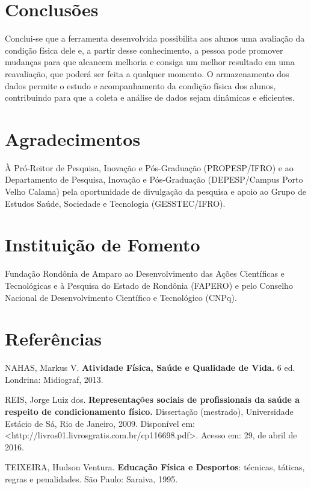 \documentclass[article,12pt,onesidea,4paper,english,brazil]{abntex2}
\begin{document}
	\section*{Conclusões}
	
	Conclui-se que a ferramenta desenvolvida possibilita aos alunos uma avaliação da condição física dele e, a partir desse conhecimento, a pessoa pode promover mudanças para que alcancem melhoria e consiga um melhor resultado em uma reavaliação, que poderá ser feita a qualquer momento. O armazenamento dos dados permite o estudo e acompanhamento da condição física dos alunos, contribuindo para que a coleta e análise de dados sejam dinâmicas e eficientes.
	
	\section*{Agradecimentos}
	À Pró-Reitor de Pesquisa, Inovação e Pós-Graduação (PROPESP/IFRO) e ao Departamento de Pesquisa, Inovação e Pós-Graduação (DEPESP/Campus Porto Velho Calama) pela oportunidade de divulgação da pesquisa e apoio ao Grupo de Estudos Saúde, Sociedade e Tecnologia (GESSTEC/IFRO).
	
	\section*{Instituição de Fomento}
	
	Fundação Rondônia de Amparo ao Desenvolvimento das Ações Científicas e Tecnológicas e à Pesquisa do Estado de Rondônia (FAPERO) e pelo Conselho Nacional de Desenvolvimento Científico e Tecnológico (CNPq).
	
	\section*{Referências}
	
\noindent NAHAS, Markus V. \textbf{Atividade Física, Saúde e Qualidade de Vida.} 6 ed. Londrina: Midiograf, 2013.

\noindent REIS, Jorge Luiz dos. \textbf{Representações sociais de profissionais da saúde a respeito de condicionamento físico.} Dissertação (mestrado), Universidade Estácio de Sá, Rio de Janeiro, 2009. Disponível em:<http://livros01.livrosgratis.com.br/cp116698.pdf>. Acesso em: 29, de abril de 2016.

\noindent TEIXEIRA, Hudson Ventura. \textbf{Educação Física e Desportos}: técnicas, táticas, regras e penalidades. São Paulo: Saraiva, 1995.
	
\end{document}
